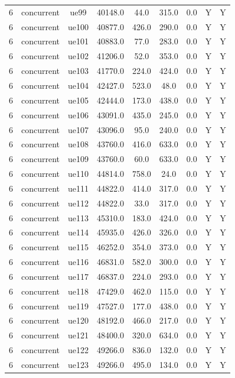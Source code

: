 \begin{table}[ht]
\begin{tabular}{|c|c|c|c|c|c|c|c|c|}
6 & concurrent & ue99 & 40148.0 & 44.0 & 315.0 & 0.0 & Y & Y \\
6 & concurrent & ue100 & 40877.0 & 426.0 & 290.0 & 0.0 & Y & Y \\
6 & concurrent & ue101 & 40883.0 & 77.0 & 283.0 & 0.0 & Y & Y \\
6 & concurrent & ue102 & 41206.0 & 52.0 & 353.0 & 0.0 & Y & Y \\
6 & concurrent & ue103 & 41770.0 & 224.0 & 424.0 & 0.0 & Y & Y \\
6 & concurrent & ue104 & 42427.0 & 523.0 & 48.0 & 0.0 & Y & Y \\
6 & concurrent & ue105 & 42444.0 & 173.0 & 438.0 & 0.0 & Y & Y \\
6 & concurrent & ue106 & 43091.0 & 435.0 & 245.0 & 0.0 & Y & Y \\
6 & concurrent & ue107 & 43096.0 & 95.0 & 240.0 & 0.0 & Y & Y \\
6 & concurrent & ue108 & 43760.0 & 416.0 & 633.0 & 0.0 & Y & Y \\
6 & concurrent & ue109 & 43760.0 & 60.0 & 633.0 & 0.0 & Y & Y \\
6 & concurrent & ue110 & 44814.0 & 758.0 & 24.0 & 0.0 & Y & Y \\
6 & concurrent & ue111 & 44822.0 & 414.0 & 317.0 & 0.0 & Y & Y \\
6 & concurrent & ue112 & 44822.0 & 33.0 & 317.0 & 0.0 & Y & Y \\
6 & concurrent & ue113 & 45310.0 & 183.0 & 424.0 & 0.0 & Y & Y \\
6 & concurrent & ue114 & 45935.0 & 426.0 & 326.0 & 0.0 & Y & Y \\
6 & concurrent & ue115 & 46252.0 & 354.0 & 373.0 & 0.0 & Y & Y \\
6 & concurrent & ue116 & 46831.0 & 582.0 & 300.0 & 0.0 & Y & Y \\
6 & concurrent & ue117 & 46837.0 & 224.0 & 293.0 & 0.0 & Y & Y \\
6 & concurrent & ue118 & 47429.0 & 462.0 & 115.0 & 0.0 & Y & Y \\
6 & concurrent & ue119 & 47527.0 & 177.0 & 438.0 & 0.0 & Y & Y \\
6 & concurrent & ue120 & 48192.0 & 466.0 & 217.0 & 0.0 & Y & Y \\
6 & concurrent & ue121 & 48400.0 & 320.0 & 634.0 & 0.0 & Y & Y \\
6 & concurrent & ue122 & 49266.0 & 836.0 & 132.0 & 0.0 & Y & Y \\
6 & concurrent & ue123 & 49266.0 & 495.0 & 134.0 & 0.0 & Y & Y \\

\end{tabular}
\end{table}
